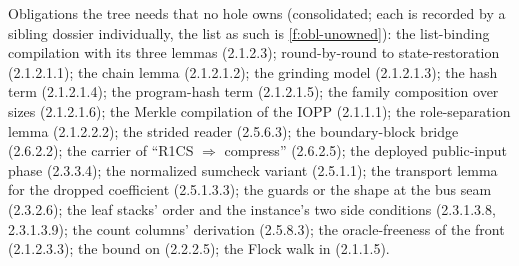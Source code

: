 Obligations the tree needs that no hole owns (consolidated; each is recorded by a sibling dossier individually, the list as such is \cref{f:obl-unowned}): the list-binding compilation with its three lemmas (2.1.2.3); round-by-round to state-restoration (2.1.2.1.1); the chain lemma (2.1.2.1.2); the grinding model (2.1.2.1.3); the hash term (2.1.2.1.4); the program-hash term (2.1.2.1.5); the family composition over sizes (2.1.2.1.6); the Merkle compilation of the IOPP (2.1.1.1); the role-separation lemma (2.1.2.2.2); the strided reader (2.5.6.3); the boundary-block bridge (2.6.2.2); the carrier of ``R1CS \ensuremath{\Rightarrow} compress'' (2.6.2.5); the deployed public-input phase (2.3.3.4); the normalized sumcheck variant (2.5.1.1); the transport lemma for the dropped coefficient (2.5.1.3.3); the guards or the shape at the bus seam (2.3.2.6); the leaf stacks' order and the instance's two side conditions (2.3.1.3.8, 2.3.1.3.9); the count columns' derivation (2.5.8.3); the oracle-freeness of the front (2.1.2.3.3); the bound on  (2.2.2.5); the Flock walk in  (2.1.1.5).

